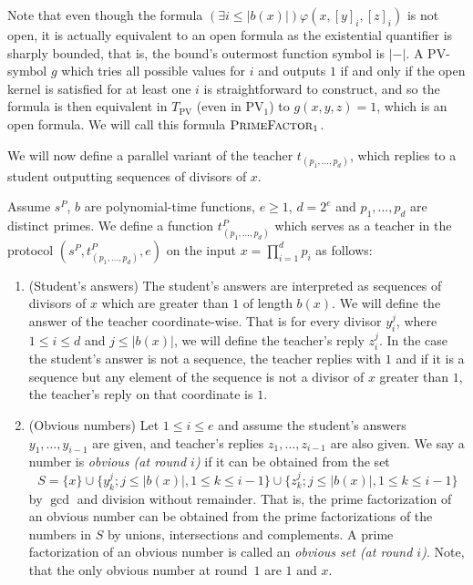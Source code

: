 \documentclass{lmcs}
\newcommand{\PV}{\text{PV}}
\newcommand{\abs}[1]{\lvert #1\rvert}
\newcommand{\PrimeFactor}{\textsc{PrimeFactor}}
\begin{document}
Note that even though the formula $(\exists i \leq \abs{b(x)})\varphi(x,[y]_i,[z]_i)$ is not open, it is actually equivalent to an open formula as the existential quantifier is sharply bounded, that is, the bound's outermost function symbol is $\abs{-}$. A $\PV$-symbol $g$ which tries all possible values for $i$ and outputs $1$ if and only if the open kernel is satisfied for at least one $i$ is straightforward to construct, and so the formula is then equivalent in $T_{\PV}$ (even in $\PV_1$) to $g(x,y,z)=1$, which is an open formula. We will call this formula $\PrimeFactor_1$.


We will now define a parallel variant of the teacher $t_{(p_1,\dots,p_d)}$, which replies to a student outputting sequences of divisors of $x$.

\begin{defi}\label{defipteacher}
    Assume $s^P$, $b$ are polynomial-time functions, ${e}\geq 1$, $d=2^{{e}}$ and $p_1,\dots,p_d$ are distinct primes. We define a function $t^P_{(p_1,\dots,p_{d})}$ which serves as a teacher in the protocol $(s^P,t^P_{(p_1,\dots,p_d)},{e})$ on the input $x=\prod_{i=1}^{d} p_i$ as follows:
    \begin{enumerate}
        \item (Student's answers) The student's answers are interpreted as sequences of divisors of $x$ which are greater than $1$ of length $b(x)$. We will define the answer of the teacher coordinate-wise. That is for every divisor $y_i^j$, where $1\leq i\leq d$ and $j\leq \abs{b(x)}$, we will define the teacher's reply $z^j_i$. In the case the student's answer is not a sequence, the teacher replies with $1$ and if it is a sequence but any element of the sequence is not a divisor of $x$ greater than $1$, the teacher's reply on that coordinate is $1$. 
         \item (Obvious numbers) Let $1\leq i\leq {e}$ and assume the student's answers $y_1,\dots,y_{i-1}$ are given, and teacher's replies $z_1,\dots,z_{i-1}$ are also given. We say a number is \emph{obvious (at round $i$)} if it can be obtained from the set 
         \[S=\{x\}\cup \{y_k^j; j \leq \abs{b(x)}, 1 \leq k \leq i-1\} \cup \{z_k^j; j \leq \abs{b(x)}, 1\leq k\leq i-1\}\] by $\gcd$ and division without remainder. That is, the prime factorization of an obvious number can be obtained from the prime factorizations of the numbers in $S$ by unions, intersections and complements. A prime factorization of an obvious number is called an \emph{obvious set (at round $i$)}. Note, that the only obvious number at round~$1$ are $1$ and $x$.

\end{enumerate}
\end{defi}
\end{document}
